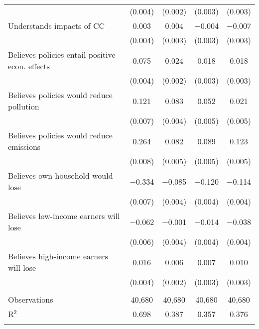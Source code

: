 \begin{tabular}{@{\extracolsep{5pt}}lcccc}
  & (0.004) & (0.002) & (0.003) & (0.003) \\ 
  Understands impacts of CC & 0.003 & 0.004 & $-$0.004 & $-$0.007 \\ 
  & (0.004) & (0.003) & (0.003) & (0.003) \\ 
  Believes policies entail positive econ. effects & 0.075 & 0.024 & 0.018 & 0.018 \\ 
  & (0.004) & (0.002) & (0.003) & (0.003) \\ 
  Believes policies would reduce pollution & 0.121 & 0.083 & 0.052 & 0.021 \\ 
  & (0.007) & (0.004) & (0.005) & (0.005) \\ 
  Believes policies would reduce emissions & 0.264 & 0.082 & 0.089 & 0.123 \\ 
  & (0.008) & (0.005) & (0.005) & (0.005) \\ 
  Believes own household would lose & $-$0.334 & $-$0.085 & $-$0.120 & $-$0.114 \\ 
  & (0.007) & (0.004) & (0.004) & (0.004) \\ 
  Believes low-income earners will lose & $-$0.062 & $-$0.001 & $-$0.014 & $-$0.038 \\ 
  & (0.006) & (0.004) & (0.004) & (0.004) \\ 
  Believes high-income earners will lose & 0.016 & 0.006 & 0.007 & 0.010 \\ 
  & (0.004) & (0.002) & (0.003) & (0.003) \\ 
 \hline \\[-1.8ex] 

Observations & 40,680 & 40,680 & 40,680 & 40,680 \\ 
R$^{2}$ & 0.698 & 0.387 & 0.357 & 0.376 \\ 
\hline 
\hline \\[-1.8ex] 
\end{tabular} 